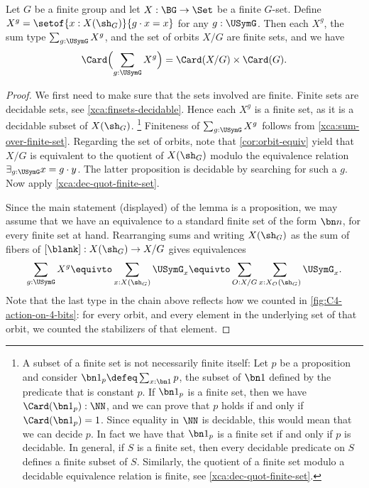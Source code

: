 \begin{lemma}
  \label{lem:burnside}
  Let $G$ be a finite group and let $X:\BG\to\Set$ be a finite $G$-set.
  Define $X^g = \setof{x:X(\sh_G)}{g\cdot x = x}$ for any $g:\USymG$.
  Then each $X^g$, the sum type $\sum_{g:\USymG} X^g$, and the set of orbits $X/G$
  are finite sets, and we have
  \[
    \Card\Bigl(\sum_{g:\USymG} X^g\Bigr) = \Card(X/G) \times \Card(G).
  \]
\end{lemma}
\begin{proof}
  We first need to make sure that the sets involved are finite. 
  Finite sets are decidable sets, see \cref{xca:finsets-decidable}.
  Hence each $X^g$ is a finite set, as it is a decidable subset of $X(\sh_G)$.%
 \footnote{%
  A subset of a finite set is not necessarily finite itself:
  Let $p$ be a proposition and consider $\bn1_p\defeq\sum_{x:\bn1}p$,
  the subset of $\bn1$ defined by the predicate that is constant $p$.
  If $\bn1_p$ is a finite set, then we have 
  $\Card(\bn1_p) :\NN$, and we can prove that
  $p$ holds if and only if $\Card(\bn1_p) = 1$.
  Since equality in $\NN$ is decidable, this would mean that
  we can decide $p$. In fact we have that $\bn1_p$ is a finite set
  if and only if $p$ is decidable.
  In general, if $S$ is a finite set, then every
  decidable predicate on $S$ defines a finite subset of $S$.
  Similarly, the quotient of a finite set modulo a decidable
  equivalence relation is finite, see \cref{xca:dec-quot-finite-set}.
 }
  Finiteness of $\sum_{g:\USymG} X^g$ follows from 
  \cref{xca:sum-over-finite-set}. Regarding the set of orbits,
  note that \cref{cor:orbit-equiv} yield that $X/G$ is equivalent
  to the quotient of $X(\sh_G)$ modulo the equivalence relation
  $\exists_{g:\USymG} x=g\cdot y$. The latter proposition is decidable by
  searching for such a $g$. Now apply \cref{xca:dec-quot-finite-set}.
  
  Since the main statement (displayed) of the lemma is a proposition, 
  we may assume that we have an equivalence to a standard finite set of 
  the form $\bn n$, for every finite set at hand.  
  Rearranging sums and writing $X(\sh_G)$ as the sum of fibers
  of $[\blank]: X(\sh_G)\to X/G$ gives equivalences
  \[
    \sum_{g:\USymG} X^g \equivto \sum_{x:X(\sh_G)} \USymG_x
    \equivto \sum_{O:X/G} \sum_{x : X_O(\sh_G)} \USymG_x.
  \]
  Note that the last type in the chain above reflects how
  we counted in \cref{fig:C4-action-on-4-bits}: for every orbit,
  and every element in the underlying set of that orbit,
  we counted the stabilizers of that element.
  

\end{proof}
